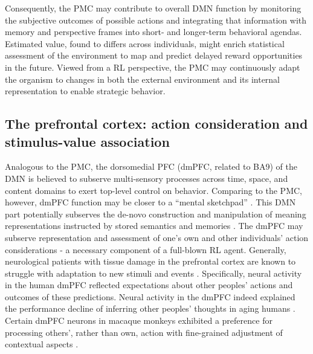 \documentclass[10pt,letterpaper]{article}
\begin{document}
Consequently, the PMC may contribute to overall DMN function
by monitoring the subjective outcomes
of possible actions and integrating that information
with memory and perspective frames
into short- and longer-term behavioral agendas.
Estimated value, found to differs across individuals, might enrich
statistical assessment of the environment
to map and predict delayed reward opportunities in the future.
Viewed from a RL perspective, the PMC may continuously adapt the organism to changes
in both the external environment and its internal representation
to enable strategic behavior.


\subsection{The prefrontal cortex: action consideration and stimulus-value association}
Analogous to the PMC,
the dorsomedial PFC (dmPFC, related to BA9) of the DMN is believed to subserve
multi-sensory processes
across time, space, and content domains to
exert top-level control on behavior.
Comparing to the PMC, however,
dmPFC function may be closer to a
``mental sketchpad'' \citep{goldman1996prefrontal}. This DMN part
potentially subserves the de-novo construction and manipulation
of meaning representations instructed by stored semantics and memories
\citep{bzdok2013segregation}.
The dmPFC may subserve representation and assessment
of one's own and other individuals' action considerations - a necessary
component of a full-blown RL agent.
Generally,
neurological patients with tissue damage in the prefrontal cortex
are known to struggle with
adaptation to new stimuli and events
\citep{stuss1986frontal}.
Specifically, neural activity in the human dmPFC
reflected expectations about other peoples' actions and
outcomes of these predictions.
Neural activity in the dmPFC indeed explained the performance decline
of inferring other peoples' thoughts in aging humans \citep{moran2012social}.
Certain dmPFC neurons in macaque monkeys exhibited a preference
for processing others', rather than own, action
with fine-grained adjustment of contextual aspects \citep{yoshida2010neural}.
%
\end{document}
